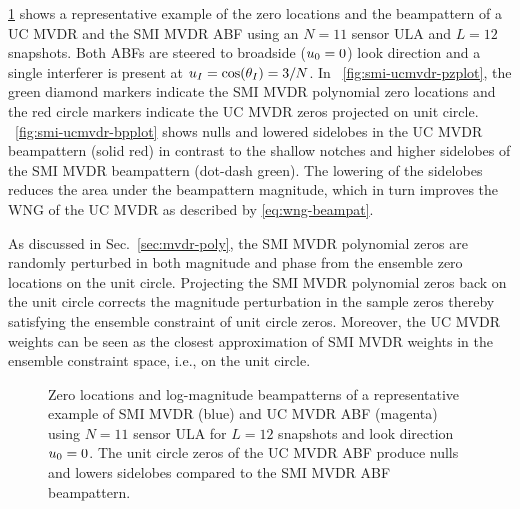 

\figurename{} \ref{fig:smi-ucmvdr-plots} shows a representative
example of the zero locations and the beampattern of a UC MVDR and the
SMI MVDR ABF using an $N = 11$ sensor ULA and $L = 12$ snapshots. Both
ABFs are steered to broadside ($u_0 = 0$) look direction and a
single interferer is present at $u_I = \cos(\theta_I) = 3/N$. In
\figurename{}~\ref{fig:smi-ucmvdr-pzplot}, the green diamond markers
indicate the SMI MVDR polynomial zero locations and the red circle
markers indicate the UC MVDR zeros projected on unit
circle. \figurename{}~\ref{fig:smi-ucmvdr-bpplot} shows nulls and
lowered sidelobes in the UC MVDR beampattern (solid red) in contrast
to the shallow notches and higher sidelobes of the SMI MVDR
beampattern (dot-dash green). The lowering of the sidelobes reduces
the area under the beampattern magnitude, which in turn improves the
WNG of the UC MVDR as described by \eqref{eq:wng-beampat}.

As discussed in Sec.~\ref{sec:mvdr-poly}, the SMI MVDR polynomial
zeros are randomly perturbed in both magnitude and phase from the
ensemble zero locations on the unit circle. Projecting the SMI MVDR
polynomial zeros back on the unit circle corrects the magnitude
perturbation in the sample zeros thereby satisfying the
ensemble constraint of unit circle zeros. Moreover, the UC MVDR
weights can be seen as the closest approximation of SMI MVDR weights
in the ensemble constraint space, i.e., on the unit circle.

\begin{figure}[!hp]
\centering
{}

\caption[Zero locations and log-magnitude beampatterns of a
representative example of SMI MVDR and UC MVDR ABF] {Zero locations
  and log-magnitude beampatterns of a representative example of SMI
  MVDR (blue) and UC MVDR ABF (magenta) using $N = 11$ sensor ULA for
  $L = 12$ snapshots and look direction $u_0 = 0$. The unit circle
  zeros of the UC MVDR ABF produce nulls and lowers sidelobes compared
  to the SMI MVDR ABF beampattern.}
\label{fig:smi-ucmvdr-plots}
\end{figure}

